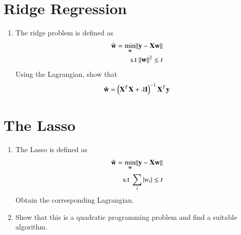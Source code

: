 \documentclass[journal,12pt,twocolumn]{IEEEtran}
\renewcommand\thesection{\arabic{section}}
\begin{document}
\section{Ridge Regression}
\begin{enumerate}[label=\thesection.\arabic*
,ref=\thesection.\theenumi]
\item The ridge problem is defined as
\begin{align}
\hat{\mathbf{w}} = \min_{\mathbf{w}}\lVert\mathbf{y}-\mathbf{X}\mathbf{w}\rVert
\\
\text{s.t } \lVert\mathbf{w}\rVert^2 \le t
\end{align}
Using the Lagrangian, show that
\begin{align}
\hat{\mathbf{w}} = \left(\mathbf{X}^T\mathbf{X}+\lambda \mathbf{I}\right)^{-1}\mathbf{X}^T\mathbf{y}
\end{align}
\end{enumerate}
\section{The Lasso}
\begin{enumerate}[label=\thesection.\arabic*
,ref=\thesection.\theenumi]
\item The Lasso is defined as
\begin{align}
\hat{\mathbf{w}} = \min_{\mathbf{w}}\lVert\mathbf{y}-\mathbf{X}\mathbf{w}\rVert
\\
\text{s.t } \sum_{i}^{}\left\vert w_i\right\vert \le t
\end{align}
Obtain the corresponding Lagrangian.
\item Show that this is a quadratic programming problem and find a suitable algorithm.
\end{enumerate}
\end{document}
